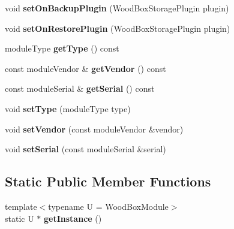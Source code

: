 \begin{DoxyCompactItemize}
void {\bfseries set\+On\+Backup\+Plugin} (Wood\+Box\+Storage\+Plugin plugin)
\item 
\mbox{\label{classwood_box_1_1module_1_1_wood_box_module_a85d4efff4708d41e3097479ab364faac}} 
void {\bfseries set\+On\+Restore\+Plugin} (Wood\+Box\+Storage\+Plugin plugin)
\item 
\mbox{\label{classwood_box_1_1module_1_1_wood_box_module_ab2507312ea013ea5c95b8e1731ddc81d}} 
module\+Type {\bfseries get\+Type} () const
\item 
\mbox{\label{classwood_box_1_1module_1_1_wood_box_module_a2d3f18ce3df3d5fe3b6230fce2199958}} 
const module\+Vendor \& {\bfseries get\+Vendor} () const
\item 
\mbox{\label{classwood_box_1_1module_1_1_wood_box_module_aa8fc11fbebc7904f144bc40b7654a215}} 
const module\+Serial \& {\bfseries get\+Serial} () const
\item 
\mbox{\label{classwood_box_1_1module_1_1_wood_box_module_a807efbd90ccdd796bfc62c15bfbc81ab}} 
void {\bfseries set\+Type} (module\+Type type)
\item 
\mbox{\label{classwood_box_1_1module_1_1_wood_box_module_af19696ed5702e009a584065892ed1501}} 
void {\bfseries set\+Vendor} (const module\+Vendor \&vendor)
\item 
\mbox{\label{classwood_box_1_1module_1_1_wood_box_module_affcbb54be4585637a88aade3e29b8a93}} 
void {\bfseries set\+Serial} (const module\+Serial \&serial)
\end{DoxyCompactItemize}
\subsection*{Static Public Member Functions}
\begin{DoxyCompactItemize}
\item 
\mbox{\label{classwood_box_1_1module_1_1_wood_box_module_a3f13bd3a6318ddf2a7db84f86b198a49}} 
{\footnotesize template$<$typename U  = Wood\+Box\+Module$>$ }\\static U $\ast$ {\bfseries get\+Instance} ()
\end{DoxyCompactItemize}
